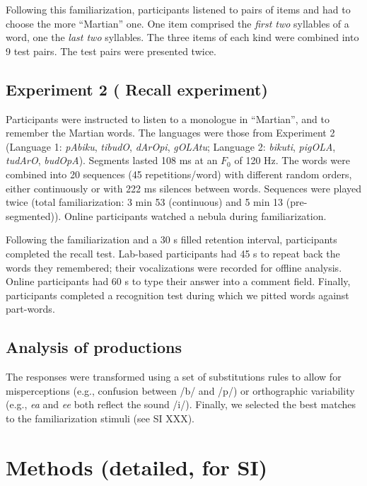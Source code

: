 \documentclass[
]{article}
\begin{document}
Following this familiarization, participants listened to pairs of items
and had to choose the more ``Martian'' one. One item comprised the
\emph{first two} syllables of a word, one the \emph{last two} syllables.
The three items of each kind were combined into 9 test pairs. The test
pairs were presented twice.

\hypertarget{experiment-2-recall-experiment}{%
\subsection{Experiment 2 ( Recall
experiment)}\label{experiment-2-recall-experiment}}

Participants were instructed to listen to a monologue in ``Martian'',
and to remember the Martian words. The languages were those from
\citet{Saffran-Science} Experiment 2 (Language 1: \emph{pAbiku},
\emph{tibudO}, \emph{dArOpi}, \emph{gOLAtu}; Language 2: \emph{bikuti},
\emph{pigOLA}, \emph{tudArO}, \emph{budOpA}). Segments lasted 108 ms at
an \(F_0\) of 120 Hz. The words were combined into 20 sequences (45
repetitions/word) with different random orders, either continuously or
with 222 ms silences between words. Sequences were played twice (total
familiarization: 3 min 53 (continuous) and 5 min 13 (pre-segmented)).
Online participants watched a nebula during familiarization.

Following the familiarization and a 30 s filled retention interval,
participants completed the recall test. Lab-based participants had 45 s
to repeat back the words they remembered; their vocalizations were
recorded for offline analysis. Online participants had 60 s to type
their answer into a comment field. Finally, participants completed a
recognition test during which we pitted words against part-words.

\hypertarget{analysis-of-productions}{%
\subsection{Analysis of productions}\label{analysis-of-productions}}

The responses were transformed using a set of substitutions rules to
allow for misperceptions (e.g., confusion between /b/ and /p/) or
orthographic variability (e.g., \emph{ea} and \emph{ee} both reflect the
sound /i/). Finally, we selected the best matches to the familiarization
stimuli (see SI XXX).

\hypertarget{methods-detailed-for-si}{%
\section{Methods (detailed, for SI)}\label{methods-detailed-for-si}}
\end{document}

